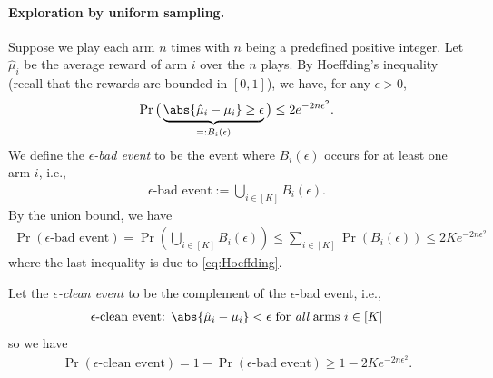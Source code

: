 \paragraph{Exploration by uniform sampling.}
Suppose we play each arm $n$ times with $n$ being a predefined positive integer. Let $\hat{\mu}_{i}$ be the average reward of arm $i$ over the $n$ plays.
By Hoeffding's inequality (recall that the rewards are bounded in $[0,1]$),  we have, for any $\epsilon>0$,
\begin{align}
\label{eq:Hoeffding}
    \Pr\big(\underbrace{\abs{\hat{\mu}_i-\mu_i} \geq \epsilon}_{=:B_i(\epsilon)}\big) \leq 2 e^{-2 n \epsilon^2}.
\end{align}
We define the {\em $\epsilon$-bad event} to be the event where $B_i(\epsilon)$ occurs for {at least} one arm $i$, i.e.,
\begin{align*}
    \text{$\epsilon$-bad event} := \textstyle\bigcup_{i\in[K]} B_i(\epsilon).
\end{align*}
By the union bound, we have
\begin{align*}
  \Pr(\text{$\epsilon$-bad event}) 
= \Pr\left(\textstyle\bigcup_{i\in[K]}B_i(\epsilon)\right) 
\leq \textstyle\sum_{i\in[K]} \Pr(B_i(\epsilon))
\leq 2K e^{-2 n \epsilon^2}
\end{align*}
where the last inequality is due to \eqref{eq:Hoeffding}.

Let the {\em $\epsilon$-clean event} to be the complement of the $\epsilon$-bad event, i.e.,
\begin{align*}
\text{
$\epsilon$-clean event: $\abs{\hat{\mu}_i-\mu_i} < \epsilon$ for {\em all} arms $i\in[K]$
}
\end{align*}
so we have 
\begin{align}
\label{eq:clean event}
    \Pr(\text{$\epsilon$-clean event})  = 1-\Pr(\text{$\epsilon$-bad event}) \geq 1- 2K e^{-2 n \epsilon^2}.
\end{align}


